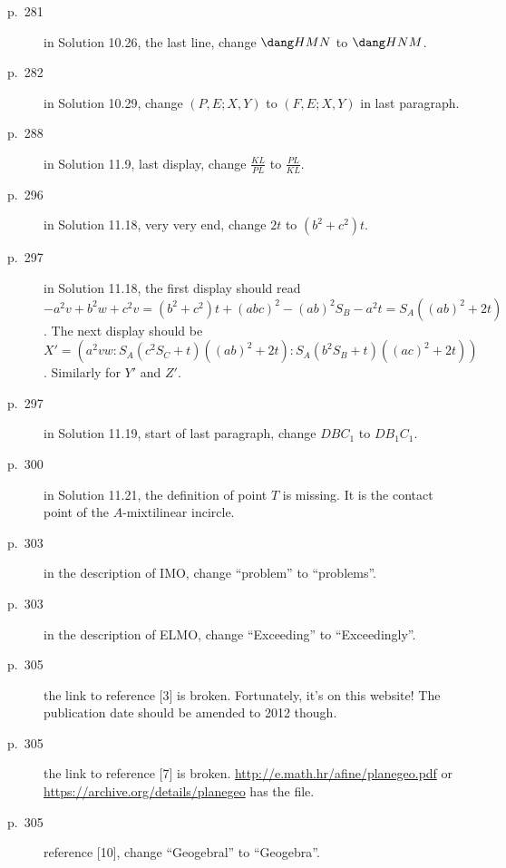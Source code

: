 \documentclass[11pt]{scrartcl}
\begin{document}
\begin{description}
\item[p.\  281] in Solution 10.26, the last line, change $\dang HMN$ to $\dang HNM$.
\item[p.\  282] in Solution 10.29, change $(P,E;X,Y)$ to $(F,E;X,Y)$ in last paragraph.
\item[p.\  288] in Solution 11.9, last display, change $\frac{KL}{PL}$ to $\frac{PL}{KL}$.
\item[p.\  296] in Solution 11.18, very very end, change $2t$ to $(b^2+c^2)t$.
\item[p.\  297] in Solution 11.18, the first display should read $-a^2v + b^2w + c^2v = (b^2+c^2)t + (abc)^2 - (ab)^2S_B - a^2t = S_A ((ab)^2 + 2t)$. The next display should be $X' = \left( a^2vw : S_A(c^2S_C+t)((ab)^2+2t) : S_A(b^2S_B+t)((ac)^2+2t) \right)$. Similarly for $Y'$ and $Z'$.
\item[p.\  297] in Solution 11.19, start of last paragraph, change $DBC_1$ to $DB_1C_1$.
\item[p.\  300] in Solution 11.21, the definition of point $T$ is missing.
  It is the contact point of the $A$-mixtilinear incircle.
\item[p.\  303] in the description of IMO, change ``problem'' to ``problems''.
\item[p.\  303] in the description of ELMO, change ``Exceeding'' to ``Exceedingly''.
\item[p.\  305] the link to reference [3] is broken. Fortunately, it's on this website! The publication date should be amended to 2012 though.
\item[p.\  305] the link to reference [7] is broken. \url{http://e.math.hr/afine/planegeo.pdf} or \url{https://archive.org/details/planegeo} has the file.
\item[p.\  305] reference [10], change ``Geogebral'' to ``Geogebra''.
\end{description}
\end{document}
